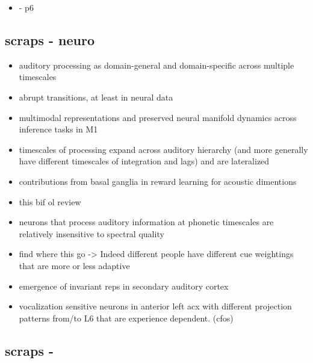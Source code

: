 \begin{itemize}
\item \citep{dubreuilComplementaryRolesDimensionality2020} - p6
\end{itemize}

\subsection{scraps - neuro}


\begin{itemize}
\item auditory processing as domain-general and domain-specific across multiple timescales \citep{norman-haignereHierarchicalIntegrationMultiple2020}
\item abrupt transitions, at least in neural data \citep{durstewitzAbruptTransitionsPrefrontal2010}
\item multimodal representations and preserved neural manifold dynamics across inference tasks in M1 \citep{gallegoCorticalPopulationActivity2018}
\item timescales of processing expand across auditory hierarchy (and more generally have different timescales of integration and lags) \citep{norman-haignereHierarchicalIntegrationMultiple2020} and are lateralized \citep{levyCircuitAsymmetriesUnderlie2019a}
\item contributions from basal ganglia in reward learning for acoustic dimentions \citep{limHowMayBasal2014}
\item this bif ol review \citep{rauscheckerMapsStreamsAuditory2009b}
\item neurons that process auditory information at phonetic timescales are relatively insensitive to spectral quality \citep{norman-haignereHierarchicalIntegrationMultiple2020}
\item find where this go -> Indeed different people have different cue weightings that are more or less adaptive\citep{clayardsDifferencesCueWeights2018}
\item emergence of invariant reps in secondary auditory cortex\citep{carruthersEmergenceInvariantRepresentation2015c}
\item vocalization sensitive neurons in anterior left acx with different projection patterns from/to L6 that are experience dependent. (cfos\citep{levyCircuitAsymmetriesUnderlie2019a})
\end{itemize}


\subsection{scraps - }